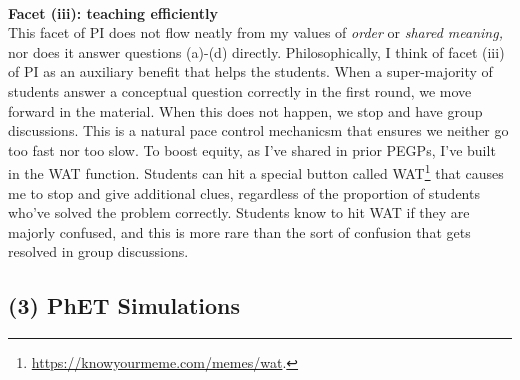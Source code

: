\documentclass[../../../main.tex]{subfiles}
\begin{document}
\\
\vspace{0.25cm}
\textbf{Facet (iii): teaching efficiently}
\\
\vspace{0.25cm}
This facet of PI does not flow neatly from my values of \textit{order} or \textit{shared meaning,} nor does it answer questions (a)-(d) directly.  Philosophically, I think of facet (iii) of PI as an auxiliary benefit that helps the students.  When a super-majority of students answer a conceptual question correctly in the first round, we move forward in the material.  When this does not happen, we stop and have group discussions.  This is a natural pace control mechanicsm that ensures we neither go too fast nor too slow.  To boost equity, as I've shared in prior PEGPs, I've built in the WAT function.  Students can hit a special button called WAT\footnote{\url{https://knowyourmeme.com/memes/wat}.} that causes me to stop and give additional clues, regardless of the proportion of students who've solved the problem correctly.  Students know to hit WAT if they are majorly confused, and this is more rare than the sort of confusion that gets resolved in group discussions.

\subsection{(3) PhET Simulations}
\end{document}
